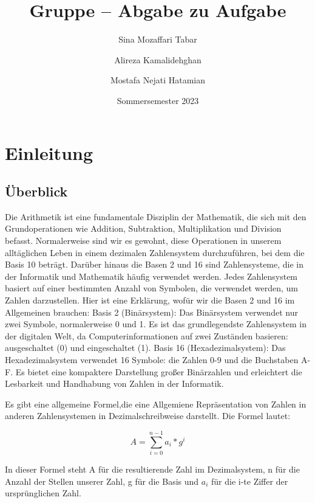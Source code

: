 \documentclass[course=erap]{aspdoc}
\author{Sina Mozaffari Tabar \and Alireza Kamalidehghan  \and Mostafa Nejati Hatamian}
\date{Sommersemester 2023} %
\title{Gruppe \theGroup{} -- Abgabe zu Aufgabe \theNumber}
\begin{document}
\maketitle

\section{Einleitung}
\subsection{Überblick}
Die Arithmetik ist eine fundamentale Disziplin der Mathematik, die sich mit den Grundoperationen wie Addition, Subtraktion, Multiplikation und Division befasst. Normalerweise sind wir es gewohnt, diese Operationen in unserem alltäglichen Leben in einem dezimalen Zahlensystem durchzuführen, bei dem die Basis 10 beträgt.
\newline
Darüber hinaus die Basen 2 und 16 sind Zahlensysteme, die in der Informatik und Mathematik häufig verwendet werden. Jedes Zahlensystem basiert auf einer bestimmten Anzahl von Symbolen, die verwendet werden, um Zahlen darzustellen. Hier ist eine Erklärung, wofür wir die Basen 2 und 16 im Allgemeinen brauchen:
\newline
\newline
Basis 2 (Binärsystem):
Das Binärsystem verwendet nur zwei Symbole, normalerweise 0 und 1. Es ist das grundlegendste Zahlensystem in der digitalen Welt, da Computerinformationen auf zwei Zuständen basieren: ausgeschaltet (0) und eingeschaltet (1).
\newline
\newline
Basis 16 (Hexadezimalsystem):
Das Hexadezimalsystem verwendet 16 Symbole: die Zahlen 0-9 und die Buchstaben A-F. Es bietet eine kompaktere Darstellung großer Binärzahlen und erleichtert die Lesbarkeit und Handhabung von Zahlen in der Informatik.
\newline
\par
Es gibt eine allgemeine Formel,die eine Allgemiene Repräsentation von Zahlen in anderen Zahlensystemen in Dezimalschreibweise darstellt. Die Formel lautet:

\begin{equation}
\label{sumFormel}
    A = \sum_{i=0} ^{n-1} a_i * g^i
\end{equation}


In dieser Formel steht A für die resultierende Zahl im Dezimalsystem, n für die Anzahl der Stellen unserer Zahl, g für die Basis und $a_i$ für die i-te Ziffer der ursprünglichen Zahl.
\newline
\end{document}
